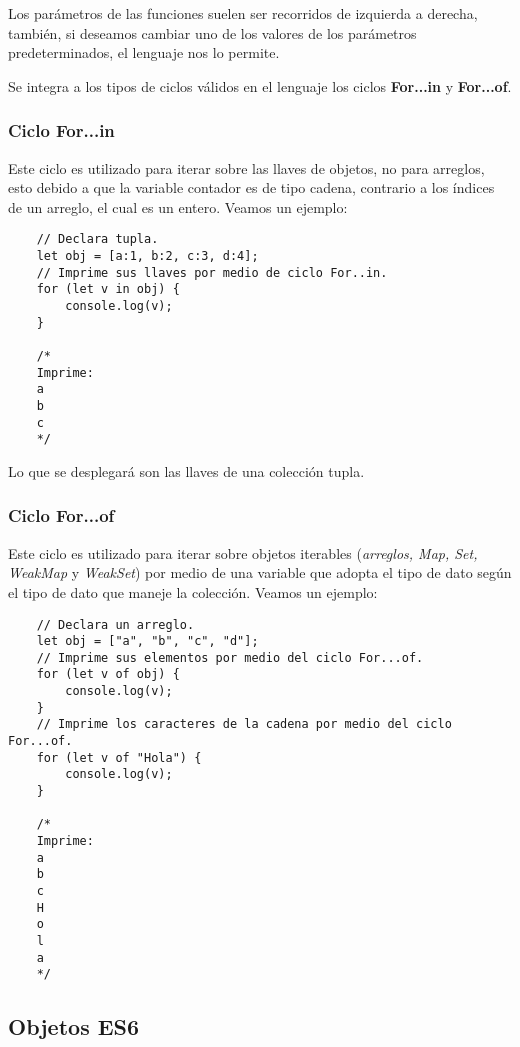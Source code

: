 Los parámetros de las funciones suelen ser recorridos de izquierda a derecha, también, si deseamos cambiar uno de los valores de los parámetros predeterminados, el lenguaje nos lo permite.

Se integra a los tipos de ciclos válidos en el lenguaje los ciclos \textbf{For...in} y \textbf{For...of}.


\subsubsection{Ciclo For...in}

Este ciclo es utilizado para iterar sobre las llaves de objetos, no para arreglos, esto debido a que la variable contador es de tipo cadena, contrario a los índices de un arreglo, el cual es un entero. Veamos un ejemplo:
\begin{lstlisting}
    // Declara tupla.
    let obj = [a:1, b:2, c:3, d:4];
    // Imprime sus llaves por medio de ciclo For..in.
    for (let v in obj) {
        console.log(v);
    }

    /*
    Imprime:
    a
    b
    c
    */
\end{lstlisting}

Lo que se desplegará son las llaves de una colección tupla.


\subsubsection{Ciclo For...of}

Este ciclo es utilizado para iterar sobre objetos iterables (\textit{arreglos, Map, Set, WeakMap} y \textit{WeakSet}) por medio de una variable que adopta el tipo de dato según el tipo de dato que maneje la colección. Veamos un ejemplo:
\begin{lstlisting}
    // Declara un arreglo.
    let obj = ["a", "b", "c", "d"];
    // Imprime sus elementos por medio del ciclo For...of.
    for (let v of obj) {
        console.log(v);
    }
    // Imprime los caracteres de la cadena por medio del ciclo For...of.
    for (let v of "Hola") {
        console.log(v);
    }

    /*
    Imprime:
    a
    b
    c
    H
    o
    l
    a
    */
\end{lstlisting}


\subsection{Objetos ES6}

